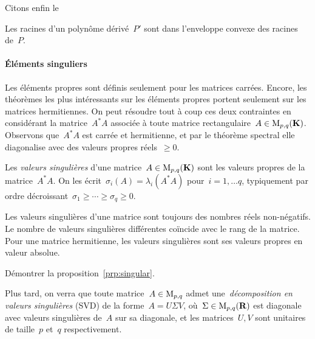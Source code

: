 Citons enfin le
\begin{exercice}
	Les racines d'un polynôme dérivé~$P'$ sont dans l'enveloppe convexe des
	racines de~$P$.
\end{exercice}

\paragraph{Éléments singuliers}
Les éléments propres sont définis seulement pour les matrices carrées.
Encore, les théorèmes les plus intéressants sur les éléments propres portent
seulement sur les matrices hermitiennes.  On peut résoudre tout à coup ces
deux contraintes en considérant la matrice~$A^*A$ associée à toute matrice
rectangulaire~$A\in\mathrm{M}_{p,q}(\mathbf{K})$.  Observons que~$A^*A$ est carrée et
hermitienne, et par le théorème spectral elle diagonalise avec des valeurs
propres réels~$\ge 0$.

\begin{definition}
	Les \emph{valeurs singulières} d'une matrice~$A\in\mathrm{M}_{p,q}(\mathbf{K})$ sont les
	valeurs propres de la matrice~$A^*A$.  On les
	écrit~$\sigma_i(A)=\lambda_i(A^*A)$ pour~$i=1,\ldots q$,
	typiquement par ordre décroissant~$\sigma_1\ge\cdots\ge\sigma_q\ge0$.
\end{definition}

\begin{proposition}
	\label{prp:singular}
	Les valeurs singulières d'une matrice sont toujours des nombres réels
	non-négatifs.  Le nombre de valeurs singulières différentes coïncide avec
	le rang de la matrice.  Pour une matrice hermitienne, les valeurs
	singulières sont ses valeurs propres en valeur absolue.
\end{proposition}

\begin{exercice}
	Démontrer la proposition~\ref{prp:singular}.
\end{exercice}

Plus tard, on verra que toute matrice~$A\in\mathrm{M}_{p,q}$ admet
une~\emph{décomposition en valeurs singulières} (SVD) de la forme~$A=U\Sigma V$,
où~$\Sigma\in\mathrm{M}_{p,q}(\mathbf{R})$ est diagonale avec valeurs singulières de~$A$
sur sa diagonale, et les matrices~$U,V$ sont unitaires de taille~$p$ et~$q$
respectivement.


